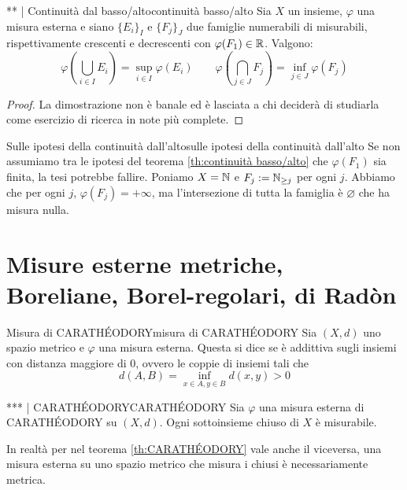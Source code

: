 \begin{theorem}{** | Continuità dal basso/alto}{continuità basso/alto}
    Sia $X$ un insieme, $\varphi$ una misura esterna e siano $\{E_i\}_I$ e $\{F_j\}_J$ due famiglie numerabili di misurabili, rispettivamente crescenti e decrescenti con $\varphi(F_1)\in \mathbb{R}$. Valgono:
    \[\varphi \left( \bigcup_{i \in I} E_i \right) = \sup_{i \in I} \varphi(E_i) \qquad \varphi \left( \bigcap_{j \in J} F_j \right) = \inf_{j \in J} \varphi(F_j)\]
    \begin{proof}
        La dimostrazione non è banale ed è lasciata a chi deciderà di studiarla come esercizio di ricerca in note più complete.
    \end{proof}
\end{theorem}
\begin{remark}{Sulle ipotesi della continuità dall'alto}{sulle ipotesi della continuità dall'alto}
    Se non assumiamo tra le ipotesi del teorema \ref{th:continuità basso/alto} che $\varphi(F_1)$ sia finita, la tesi potrebbe fallire. Poniamo $X = \mathbb{N}$ e $F_j := \mathbb{N}_{\ge j}$ per ogni $j$. Abbiamo che per ogni $j$, $\varphi(F_j) = +\infty$, ma l'intersezione di tutta la famiglia è $\varnothing$ che ha misura nulla.
\end{remark}

\section{Misure esterne metriche, Boreliane, Borel-regolari, di Radòn}

\begin{definition}{Misura di CARATHÉODORY}{misura di CARATHÉODORY}
    Sia $(X,d)$ uno spazio metrico e $\varphi$ una misura esterna. Questa si dice  se è addittiva sugli insiemi con distanza maggiore di $0$, ovvero le coppie di insiemi tali che
    \[d(A,B) = \inf_{x \in A, y \in B} d(x,y)> 0\]
\end{definition}

\begin{theorem}{*** | CARATHÉODORY}{CARATHÉODORY}
    Sia $\varphi$ una misura esterna di CARATHÉODORY su $(X,d)$. Ogni sottoinsieme chiuso di $X$ è misurabile.
\end{theorem}

\begin{remark}{}{}
    In realtà per nel teorema \ref{th:CARATHÉODORY} vale anche il viceversa, una misura esterna su uno spazio metrico che misura i chiusi è necessariamente metrica.
\end{remark}


